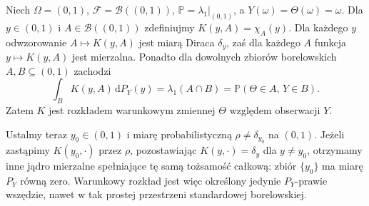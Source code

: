 \begin{przyklad}
Niech $\Omega=(0,1)$, $\mathcal F=\mathcal B((0,1))$,
$\mathbb P=\lambda_1|_{(0,1)}$, a $Y(\omega)=\Theta(\omega)=\omega$.
Dla $y\in(0,1)$ i $A\in\mathcal B((0,1))$ zdefiniujmy
$K(y,A)=\chi_A(y)$. Dla każdego $y$ odwzorowanie
$A\mapsto K(y,A)$ jest miarą Diraca $\delta_y$,
zaś dla każdego $A$ funkcja $y\mapsto K(y,A)$ jest
mierzalna. Ponadto dla dowolnych zbiorów borelowskich
$A,B\subseteq(0,1)$ zachodzi
\[
 \int_B K(y,A)\,\mathrm dP_Y(y)
 =\lambda_1(A\cap B)
 =\mathbb P(\Theta\in A,\,Y\in B).
\]
Zatem $K$ jest rozkładem warunkowym zmiennej
$\Theta$ względem obserwacji $Y$.

Ustalmy teraz $y_0\in(0,1)$ i miarę
probabilistyczną $\rho\ne\delta_{y_0}$ na $(0,1)$. Jeżeli zastąpimy
$K(y_0,\cdot)$ przez $\rho$, pozostawiając
$K(y,\cdot)=\delta_y$ dla $y\ne y_0$, otrzymamy
inne jądro mierzalne spełniające tę samą tożsamość
całkową: zbiór $\{y_0\}$ ma miarę $P_Y$ równą zero.
Warunkowy rozkład jest więc określony jedynie
$P_Y$-prawie wszędzie, nawet w tak prostej przestrzeni
standardowej borelowskiej.
\end{przyklad}
